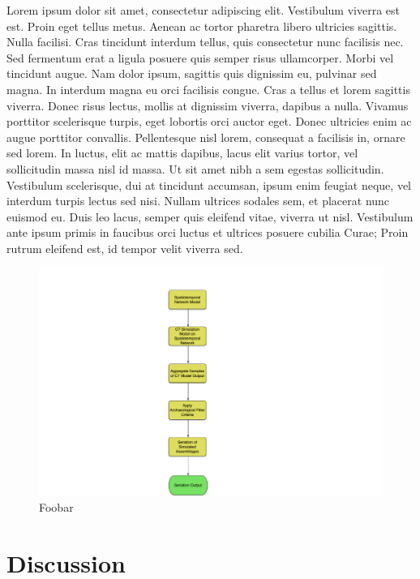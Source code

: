 \documentclass[graybox,natbib]{svmult}
\begin{document}
Lorem ipsum dolor sit amet, consectetur adipiscing elit. Vestibulum
viverra est est. Proin eget tellus metus. Aenean ac tortor pharetra
libero ultricies sagittis. Nulla facilisi. Cras tincidunt interdum
tellus, quis consectetur nunc facilisis nec. Sed fermentum erat a ligula
posuere quis semper risus ullamcorper. Morbi vel tincidunt augue. Nam
dolor ipsum, sagittis quis dignissim eu, pulvinar sed magna. In interdum
magna eu orci facilisis congue. Cras a tellus et lorem sagittis viverra.
Donec risus lectus, mollis at dignissim viverra, dapibus a nulla.
Vivamus porttitor scelerisque turpis, eget lobortis orci auctor eget.
Donec ultricies enim ac augue porttitor convallis. Pellentesque nisl
lorem, consequat a facilisis in, ornare sed lorem. In luctus, elit ac
mattis dapibus, lacus elit varius tortor, vel sollicitudin massa nisl id
massa. Ut sit amet nibh a sem egestas sollicitudin. Vestibulum
scelerisque, dui at tincidunt accumsan, ipsum enim feugiat neque, vel
interdum turpis lectus sed nisi. Nullam ultrices sodales sem, et
placerat nunc euismod eu. Duis leo lacus, semper quis eleifend vitae,
viverra ut nisl. Vestibulum ante ipsum primis in faucibus orci luctus et
ultrices posuere cubilia Curae; Proin rutrum eleifend est, id tempor
velit viverra sed.

\begin{figure}[ht]
\centering
\includegraphics[scale=0.4]{seriationct-high-level-flow.pdf}
\caption{Foobar}
\label{img:seriationct-flow}
\end{figure}

\section{Discussion}\label{discussion}
\end{document}
